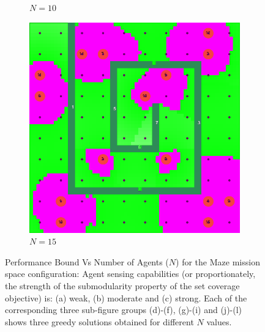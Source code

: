 \documentclass[conference]{IEEEtran}
\begin{document}
\begin{figure}[t]
\begin{subfigure}[t]{0.10\textwidth}
        \caption{$N=10$}
    \end{subfigure}\hfill
    \begin{subfigure}[t]{0.10\textwidth}
        \centering
        \includegraphics[width=\textwidth]{Figures/Maze2_3.png}
        \caption{$N=15$}
    \end{subfigure}
    \caption{Performance Bound Vs Number of Agents ($N$) for the Maze mission space configuration: Agent sensing capabilities (or proportionately, the strength of the submodularity property of the set coverage objective) is: (a) weak, (b) moderate and (c) strong. Each of the corresponding three sub-figure groups (d)-(f), (g)-(i) and (j)-(l) shows three greedy solutions obtained for different $N$ values.}
    \label{Fig:MazeConfigBetaVsN}
\end{figure}
\end{document}
